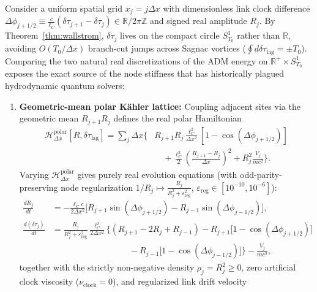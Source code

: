 \documentclass[11pt, a4paper]{article}
\theoremstyle{definition}
\begin{document}
Consider a uniform spatial grid $x_j = j\Delta x$ with dimensionless link clock difference $\Delta\phi_{j+1/2} \equiv \frac{c}{\ell_C}(\delta\tau_{j+1} - \delta\tau_j) \in \mathbb{R}/2\pi\mathbb{Z}$ and signed real amplitude $R_j$. By Theorem~\ref{thm:wallstrom}, $\delta\tau_j$ lives on the compact circle $S^1_{T_0}$ rather than $\mathbb{R}$, avoiding $O(T_0/\Delta x)$ branch-cut jumps across Sagnac vortices ($\oint d\delta\tau_{\text{lag}} = \pm T_0$). Comparing the two natural real discretizations of the ADM energy on $\mathbb{R}^+ \times S^1_{T_0}$ exposes the exact source of the node stiffness that has historically plagued hydrodynamic quantum solvers:
\begin{enumerate}[label=(\alph*)]
    \item \textbf{Geometric-mean polar K\"{a}hler lattice:} Coupling adjacent sites via the geometric mean $R_{j+1} R_j$ defines the real polar Hamiltonian
    \begin{equation}
    \label{eq:polar_kahler_lattice}
    \begin{aligned}
    \mathcal{H}_{\Delta x}^{\text{polar}}[R, \delta\tau_{\text{lag}}] = \sum_j \Delta x \Bigg\{ &R_{j+1} R_j \frac{\ell_C^2}{\Delta x^2}\left[ 1 - \cos(\Delta\phi_{j+1/2}) \right] \\
    &\quad + \frac{\ell_C^2}{2}\left( \frac{R_{j+1} - R_j}{\Delta x} \right)^2 + R_j^2 \frac{V_j}{m c^2} \Bigg\}.
    \end{aligned}
    \end{equation}
    Varying $\mathcal{H}_{\Delta x}^{\text{polar}}$ gives purely real evolution equations (with odd-parity-preserving node regularization $1/R_j \mapsto \frac{R_j}{R_j^2 + \varepsilon_{\text{reg}}^2}$, $\varepsilon_{\text{reg}} \in [10^{-10}, 10^{-6}]$):
    \begin{align}
    \frac{dR_j}{dt} &= -\frac{\ell_C c}{2\Delta x^2}\Big[ R_{j+1}\sin(\Delta\phi_{j+1/2}) - R_{j-1}\sin(\Delta\phi_{j-1/2}) \Big], \label{eq:polar_dR_dt} \\
    \frac{d(\delta\tau_j)}{dt} &= \frac{R_j}{R_j^2 + \varepsilon_{\text{reg}}^2}\frac{\ell_C^2}{2\Delta x^2}\Big\{ (R_{j+1} - 2R_j + R_{j-1}) - R_{j+1}\big[1 - \cos(\Delta\phi_{j+1/2})\big] \nonumber \\
    &\qquad\qquad\qquad\qquad\quad - R_{j-1}\big[1 - \cos(\Delta\phi_{j-1/2})\big] \Big\} - \frac{V_j}{mc^2}, \label{eq:polar_dtau_dt}
    \end{align}
    together with the strictly non-negative density $\rho_j = R_j^2 \ge 0$, zero artificial clock viscosity ($\nu_{\text{clock}} = 0$), and regularized link drift velocity

\end{enumerate}
\end{document}
